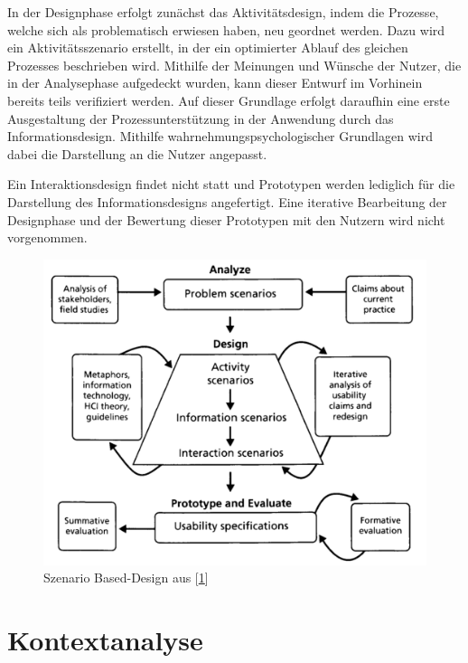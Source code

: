 \documentclass[
  12pt,
  ngerman,
  a4paper,
]{article}
\begin{document}
In der Designphase erfolgt zunächst das Aktivitätsdesign, indem die
Prozesse, welche sich als problematisch erwiesen haben, neu geordnet
werden. Dazu wird ein Aktivitätsszenario erstellt, in der ein
optimierter Ablauf des gleichen Prozesses beschrieben wird. Mithilfe der
Meinungen und Wünsche der Nutzer, die in der Analysephase aufgedeckt
wurden, kann dieser Entwurf im Vorhinein bereits teils verifiziert
werden. Auf dieser Grundlage erfolgt daraufhin eine erste Ausgestaltung
der Prozessunterstützung in der Anwendung durch das Informationsdesign.
Mithilfe wahrnehmungspsychologischer Grundlagen wird dabei die
Darstellung an die Nutzer angepasst.

Ein Interaktionsdesign findet nicht statt und Prototypen werden
lediglich für die Darstellung des Informationsdesigns angefertigt. Eine
iterative Bearbeitung der Designphase und der Bewertung dieser
Prototypen mit den Nutzern wird nicht vorgenommen.

\begin{figure}
\hypertarget{fig:sbd}{%
\centering
\includegraphics{./tex2pdf.-930e6666e1221838/e706dd62fa4a06e8ad5c31ed0d657fd3a87224be.png}
\caption{Szenario Based-Design aus
{[}\protect\hyperlink{ref-sbd}{1}{]}}\label{fig:sbd}
}
\end{figure}

\hypertarget{sec:context}{%
\section{Kontextanalyse}\label{sec:context}}
\end{document}
